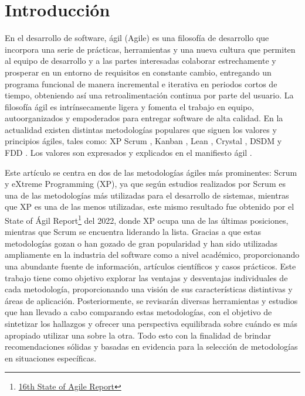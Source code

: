 \documentclass[a4paper,10pt]{article}
\begin{document}
	\section{Introducción}
	En el desarrollo de software, ágil (Agile) es una filosofía de desarrollo que incorpora una serie de prácticas, herramientas y una nueva cultura que permiten al equipo de desarrollo y a las partes interesadas colaborar estrechamente y prosperar en un entorno de requisitos en constante cambio, entregando un programa funcional de manera incremental e iterativa en periodos cortos de tiempo, obteniendo así una retroalimentación continua por parte del usuario. La filosofía ágil es intrínsecamente ligera y fomenta el trabajo en equipo, autoorganizados y empoderados para entregar software de alta calidad. En la actualidad existen distintas metodologías populares que siguen los valores y principios ágiles, tales como: XP \parencite{Beck_Andres_2005} Scrum \parencite{sutherland2014scrum}, Kanban \parencite{anderson2010kanban}, Lean \parencite{poppendieck2003lean}, Crystal \parencite{cockburn2004crystal}, DSDM \parencite{stapleton1997dynamic} y FDD \parencite{palmer2001practical}. Los valores son expresados y explicados en el manifiesto ágil \parencite{Manifesto_for_Agile_Software_Development}.
	
	Este artículo se centra en dos de las metodologías ágiles más prominentes: Scrum y eXtreme Programming (XP), ya que según estudios realizados por \textcite{fuior2019key} Scrum es una de las metodologías más utilizadas para el desarrollo de sistemas, mientras que XP es una de las menos utilizadas, este mismo resultado fue obtenido por el State of Ágil Report\footnote{\href{https://info.digital.ai/rs/981-LQX-968/images/SOA16.pdf}{16th State of Agile Report}} del 2022, donde XP ocupa una de las últimas posiciones, mientras que Scrum se encuentra liderando la lista. Gracias a que estas metodologías gozan o han gozado de gran popularidad y han sido utilizadas ampliamente en la industria del software como a nivel académico, proporcionando una abundante fuente de información, artículos científicos y casos prácticos. Este trabajo tiene como objetivo explorar las ventajas y desventajas individuales de cada metodología, proporcionando una visión de sus características distintivas y áreas de aplicación. Posteriormente, se revisarán diversas herramientas y estudios que han llevado a cabo comparando estas metodologías, con el objetivo de sintetizar los hallazgos y ofrecer una perspectiva equilibrada sobre cuándo es más apropiado utilizar una sobre la otra. Todo esto con la finalidad de brindar recomendaciones sólidas y basadas en evidencia para la selección de metodologías en situaciones específicas.
\end{document}
